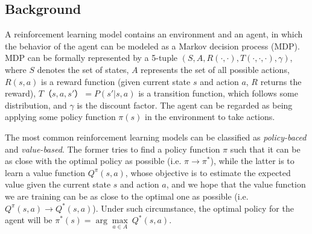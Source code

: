 \documentclass[a0,portrait]{a0poster}
\begin{document}
\begin{multicols}{2}
\section*{Background}
A reinforcement learning model contains an environment and an agent, in which the behavior of the agent can be modeled as a Markov decision process (MDP). MDP can be formally represented by a 5-tuple $(S,A,R(\cdot,\cdot),T(\cdot, \cdot, \cdot),\gamma)$, where $S$ denotes the set of states, $A$ represents the set of all possible actions, $R(s,a)$ is a reward function (given current state $s$ and action $a$, $R$ returns the reward), $T（s,a,s'）=P(s'|s,a)$ is a transition function, which follows some distribution, and $\gamma$ is the discount factor. The agent can be regarded as being applying some policy function $\pi(s)$ in the environment to take actions.\par

The most common reinforcement learning models can be classified as \emph{policy-baced} and \emph{value-based}. The former tries to find a policy function $\pi$ such that it can be as close with the optimal policy as possible (i.e. $\pi \rightarrow \pi^*$), while the latter is to learn a value function $Q^\pi (s,a)$, whose objective is to estimate the expected value given the current state $s$ and action $a$, and we hope that the value function we are training can be as close to the optimal one as possible (i.e. $Q^\pi (s,a) \rightarrow Q^* (s,a)$). Under such circumstance, the optimal policy for the agent will be $\pi^*(s) = \arg \underset{a \in A}\max\ Q^*(s,a)$.\par


\end{multicols}
\end{document}
